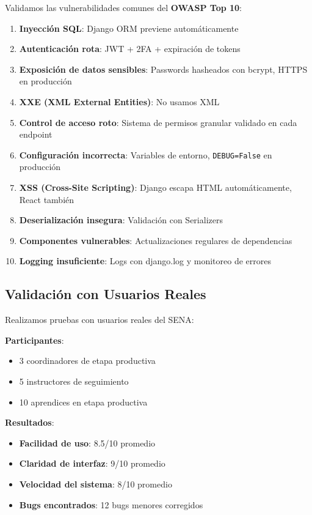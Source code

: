 Validamos las vulnerabilidades comunes del \textbf{OWASP Top 10}:

\begin{enumerate}
    \item \textbf{Inyección SQL}: Django ORM previene automáticamente
    \item \textbf{Autenticación rota}: JWT + 2FA + expiración de tokens
    \item \textbf{Exposición de datos sensibles}: Passwords hasheados con bcrypt, HTTPS en producción
    \item \textbf{XXE (XML External Entities)}: No usamos XML
    \item \textbf{Control de acceso roto}: Sistema de permisos granular validado en cada endpoint
    \item \textbf{Configuración incorrecta}: Variables de entorno, \texttt{DEBUG=False} en producción
    \item \textbf{XSS (Cross-Site Scripting)}: Django escapa HTML automáticamente, React también
    \item \textbf{Deserialización insegura}: Validación con Serializers
    \item \textbf{Componentes vulnerables}: Actualizaciones regulares de dependencias
    \item \textbf{Logging insuficiente}: Logs con django.log y monitoreo de errores
\end{enumerate}

\subsection{Validación con Usuarios Reales}

Realizamos pruebas con usuarios reales del SENA:

\textbf{Participantes}:
\begin{itemize}
    \item 3 coordinadores de etapa productiva
    \item 5 instructores de seguimiento
    \item 10 aprendices en etapa productiva
\end{itemize}

\textbf{Resultados}:
\begin{itemize}
    \item \textbf{Facilidad de uso}: 8.5/10 promedio
    \item \textbf{Claridad de interfaz}: 9/10 promedio
    \item \textbf{Velocidad del sistema}: 8/10 promedio
    \item \textbf{Bugs encontrados}: 12 bugs menores corregidos
\end{itemize}

